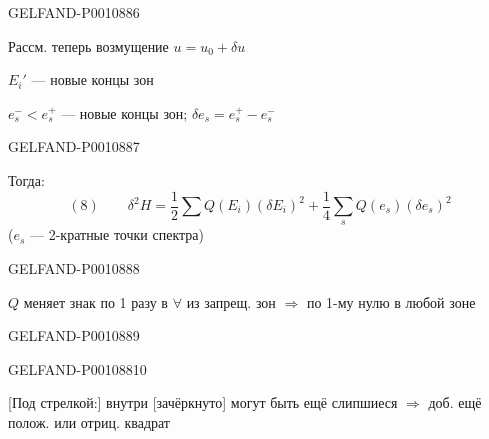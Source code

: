 \begin{GelfandAdjacentEvidence}{GELFAND-P001088}{6}


Рассм. теперь возмущение $u=u_0+\delta u$

$E_i'$ — новые концы зон

$e_s^-<e_s^+$ — новые концы зон; $\delta e_s=e_s^+-e_s^-$
\end{GelfandAdjacentEvidence}
\begin{GelfandAdjacentEvidence}{GELFAND-P001088}{7}


Тогда:
\[
(8)\qquad
\delta^2H=\frac12\sum Q(E_i)(\delta E_i)^2
+\frac14\sum_s Q(e_s)(\delta e_s)^2
\]
($e_s$ — 2-кратные точки спектра)
\end{GelfandAdjacentEvidence}
\begin{GelfandAdjacentEvidence}{GELFAND-P001088}{8}


$Q$ меняет знак по 1 разу в $\forall$ из запрещ. зон $\Rightarrow$ по 1-му нулю в любой зоне
\end{GelfandAdjacentEvidence}
\begin{GelfandAdjacentEvidence}{GELFAND-P001088}{9}


\end{GelfandAdjacentEvidence}
\begin{GelfandAdjacentEvidence}{GELFAND-P001088}{10}

[Под стрелкой:] внутри [зачёркнуто] могут быть ещё слипшиеся $\Rightarrow$ доб. ещё полож. или отриц. квадрат
\end{GelfandAdjacentEvidence}
